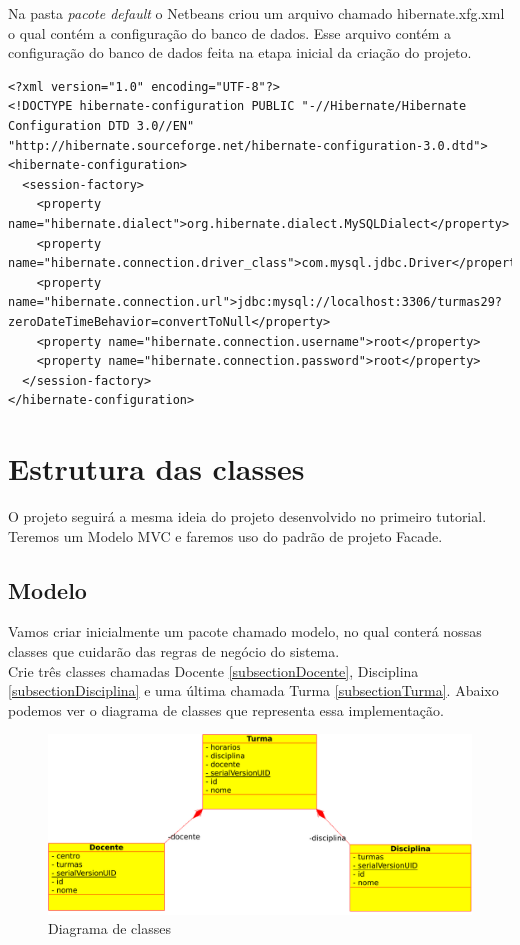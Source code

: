 \documentclass[12pt,a4paper]{article}
\begin{document}
Na pasta \textit{pacote default} o Netbeans criou um arquivo chamado hibernate.xfg.xml o qual contém a configuração do banco de dados.
Esse arquivo contém a configuração do banco de dados feita na etapa inicial da criação do projeto.



\lstset{language=HTML}
\begin{lstlisting}
<?xml version="1.0" encoding="UTF-8"?>
<!DOCTYPE hibernate-configuration PUBLIC "-//Hibernate/Hibernate Configuration DTD 3.0//EN" "http://hibernate.sourceforge.net/hibernate-configuration-3.0.dtd">
<hibernate-configuration>
  <session-factory>
    <property name="hibernate.dialect">org.hibernate.dialect.MySQLDialect</property>
    <property name="hibernate.connection.driver_class">com.mysql.jdbc.Driver</property>
    <property name="hibernate.connection.url">jdbc:mysql://localhost:3306/turmas29?zeroDateTimeBehavior=convertToNull</property>
    <property name="hibernate.connection.username">root</property>
    <property name="hibernate.connection.password">root</property>
  </session-factory>
</hibernate-configuration>
\end{lstlisting}

\newpage
\section{Estrutura das classes}

O projeto seguirá a mesma ideia do projeto desenvolvido no primeiro tutorial. Teremos um Modelo MVC e faremos uso do padrão de projeto Facade.

\subsection{Modelo}
Vamos criar inicialmente um pacote chamado modelo, no qual conterá nossas classes que cuidarão das regras de negócio do sistema.\\
Crie três classes chamadas Docente \ref{subsectionDocente}, Disciplina \ref{subsectionDisciplina} e uma última chamada Turma \ref{subsectionTurma}. Abaixo podemos ver o diagrama de classes que representa essa implementação.\\

\begin{figure}[H]
    \centering
    \includegraphics[scale=0.50]{DiagramaClasses.pdf}
    \caption{Diagrama de classes}
    \label{imagemDiagramaClasses}
\end{figure}
\end{document}
